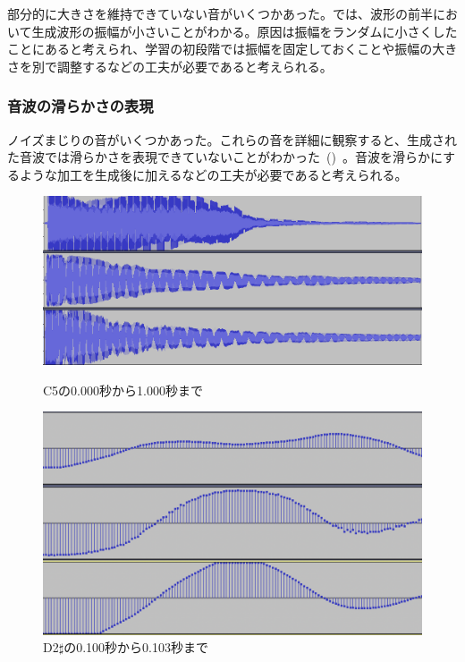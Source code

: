 部分的に大きさを維持できていない音がいくつかあった。では、波形の前半において生成波形の振幅が小さいことがわかる。原因は振幅をランダムに小さくしたことにあると考えられ、学習の初段階では振幅を固定しておくことや振幅の大きさを別で調整するなどの工夫が必要であると考えられる。
    
\subsubsection{音波の滑らかさの表現}

ノイズまじりの音がいくつかあった。これらの音を詳細に観察すると、生成された音波では滑らかさを表現できていないことがわかった~()~。音波を滑らかにするような加工を生成後に加えるなどの工夫が必要であると考えられる。

\begin{figure}[b]
\centering
\begin{minipage}[b]{0.48\columnwidth}
\centering
\includegraphics[width=0.85\columnwidth]{figure/88_88/c5.png}
\caption[C5の音波]{C5の0.000秒から1.000秒まで}
\label{fig:88_88_amp}
\end{minipage}
\begin{minipage}[b]{0.48\columnwidth}
\centering
\includegraphics[width=0.75\columnwidth]{figure/88_88_det/d2s_0100_0103.png}
\caption[D2$\sharp$の音波]{D2$\sharp$の0.100秒から0.103秒まで}
\label{fig:88_88_smooth}
\end{minipage}
\end{figure}

